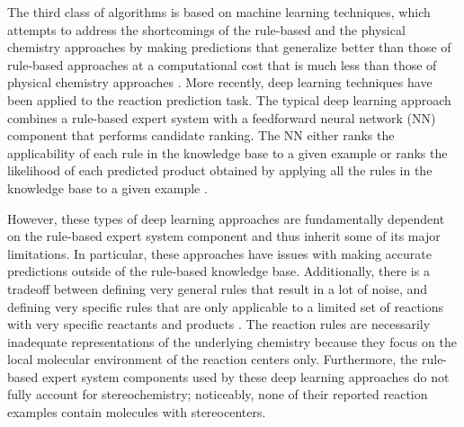 The third class of algorithms is based on machine learning techniques, which attempts to address the shortcomings of the rule-based and the physical chemistry approaches by making predictions that generalize better than those of rule-based approaches at a computational cost that is much less than those of physical chemistry approaches \cite{kayala2011learning, kayala2012reactionpredictor, carrera2009machine, zhang2005structure}. More recently, deep learning techniques have been applied to the reaction prediction task. The typical deep learning approach combines a rule-based expert system with a feedforward neural network (NN) component that performs candidate ranking. The NN either ranks the applicability of each rule in the knowledge base to a given example \cite{segler2017neural, wei2016neural} or ranks the likelihood of each predicted product obtained by applying all the rules in the knowledge base to a given example \cite{coley2017prediction}.

However, these types of deep learning approaches are fundamentally dependent on the rule-based expert system component and thus inherit some of its major limitations. In particular, these approaches have issues with making accurate predictions outside of the rule-based knowledge base. Additionally, there is a tradeoff between defining very general rules that result in a lot of noise, and defining very specific rules that are only applicable to a limited set of reactions with very specific reactants and products \cite{segler2017neural}. The reaction rules are necessarily inadequate representations of the underlying chemistry because they focus on the local molecular environment of the reaction centers only. Furthermore, the rule-based expert system components used by these deep learning approaches do not fully account for stereochemistry; noticeably, none of their reported reaction examples contain molecules with stereocenters.

